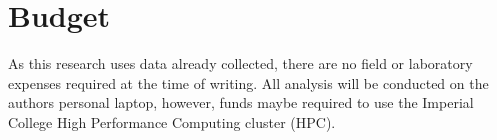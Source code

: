 \documentclass[11pt,usenames,dvipsnames]{article}
\begin{document}
\section{Budget}
As this research uses data already collected, there are no field or laboratory expenses required at the time of writing. All analysis will be conducted on the authors personal laptop, however, funds maybe required to use the Imperial College High Performance Computing cluster (HPC).
\end{document}
